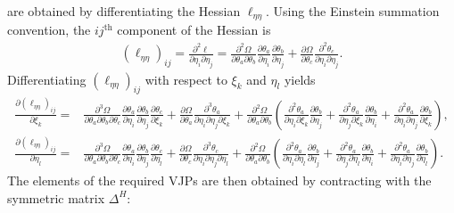 \documentclass{article}
\begin{document}
are obtained by differentiating the Hessian $\ell_{\eta\eta}$.
Using the Einstein summation convention, the $ij^\text{th}$ component of the Hessian is
%
\begin{align}
  (\ell_{\eta\eta})_{ij}
  = \frac{\partial^2 \ell}{\partial \eta_i \partial \eta_j}
  = \frac{\partial^2 \Omega}{\partial \theta_a \partial \theta_b} \frac{\partial \theta_a}{\partial \eta_i} \frac{\partial \theta_b}{\partial \eta_j}
  + \frac{\partial \Omega}{\partial \theta_c} \frac{\partial^2 \theta_c}{\partial \eta_i \partial \eta_j}.
\end{align}
%
Differentiating $(\ell_{\eta\eta})_{ij}$ with respect to $\xi_k$ and $\eta_l$ yields
%
\begin{align}
  \tfrac{\partial (\ell_{\eta\eta})_{ij}}{\partial \xi_k}
  = & \tfrac{\partial^3 \Omega}{\partial \theta_a \partial \theta_b \partial \theta_c}
  \tfrac{\partial \theta_a}{\partial \eta_i} \tfrac{\partial \theta_b}{\partial \eta_j} \tfrac{\partial \theta_c}{\partial \xi_k}
  + \tfrac{\partial \Omega}{\partial \theta_a}
  \tfrac{\partial^3 \theta_a}{\partial \eta_i \partial \eta_j \partial \xi_k} + \tfrac{\partial^2 \Omega}{\partial \theta_a \partial \theta_b}
  \left(
  \tfrac{\partial^2 \theta_a}{\partial \eta_i \partial \xi_k} \tfrac{\partial \theta_b}{\partial \eta_j}
  + \tfrac{\partial^2 \theta_a}{\partial \eta_j \partial \xi_k} \tfrac{\partial \theta_b}{\partial \eta_i}
  + \tfrac{\partial^2 \theta_a}{\partial \eta_i \partial \eta_j} \tfrac{\partial \theta_b}{\partial \xi_k}
  \right), \label{eq:third-derivative-ell-eta-eta-xi}                                  \\
  \tfrac{\partial (\ell_{\eta\eta})_{ij}}{\partial \eta_l}
  = & \tfrac{\partial^3 \Omega}{\partial \theta_a \partial \theta_b \partial \theta_c}
  \tfrac{\partial \theta_a}{\partial \eta_i} \tfrac{\partial \theta_b}{\partial \eta_j} \tfrac{\partial \theta_c}{\partial \eta_l}
  + \tfrac{\partial \Omega}{\partial \theta_c}
  \tfrac{\partial^3 \theta_c}{\partial \eta_i \partial \eta_j \partial \eta_l} + \tfrac{\partial^2 \Omega}{\partial \theta_a \partial \theta_b}
  \left(
  \tfrac{\partial^2 \theta_a}{\partial \eta_i \partial \eta_l} \tfrac{\partial \theta_b}{\partial \eta_j}
  + \tfrac{\partial^2 \theta_a}{\partial \eta_j \partial \eta_l} \tfrac{\partial \theta_b}{\partial \eta_i}
  + \tfrac{\partial^2 \theta_a}{\partial \eta_i \partial \eta_j} \tfrac{\partial \theta_b}{\partial \eta_l}
  \right). \label{eq:third-derivative-ell-eta-eta-eta}
\end{align}
%
The elements of the required VJPs are then obtained by contracting with the symmetric matrix $\Delta^H$:
\end{document}
